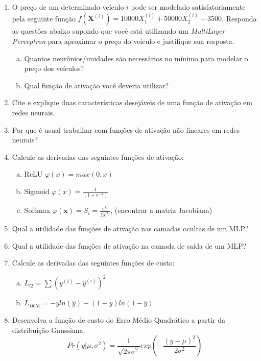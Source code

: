 \documentclass{dlproblemset}
\begin{document}
\begin{enumerate}[1)]
    \item O preço de um determinado veículo $i$ pode ser modelado satisfatoriamente pela seguinte função $f(\mathbf{X}^{(i)}) = 10000 X^{(i)}_{1} + 50000 X^{(i)}_{2} + 3500$. Responda as questões abaixo supondo que você está utilizando um \textit{MultiLayer Perceptron} para aproximar o preço do veículo e justifique sua resposta.
    \begin{enumerate}[(a)]
	    \item Quantos neurônios/unidades são necessários no mínimo para modelar o preço dos veículos?
	    \item Qual função de ativação você deveria utilizar?
    \end{enumerate}

    \item Cite e explique duas características desejáveis de uma função de ativação em redes neurais.

    \item Por que é usual trabalhar com funções de ativação não-lineares em redes neurais?

    \item Calcule as derivadas das seguintes funções de ativação:
    \begin{enumerate}[a)]
        \item ReLU $\varphi(x)=max(0,x)$
        \item Sigmoid $\varphi(x)=\frac{1}{(1+e^{-x})}$
        \item {} Softmax $\varphi(\mathbf{x})=S_i=\frac{e^{x_i}}{\Sigma e^{x_j}}$, (encontrar a matriz Jacobiana)
    \end{enumerate}

    \item Qual a utilidade das funções de ativação nas camadas ocultas de um MLP?

    \item Qual a utilidade das funções de ativação na camada de saída de um MLP?

    \item Calcule as derivadas das seguintes funções de custo:
    \begin{enumerate}[a)]
        \item  $L_{l2}=\sum\left(y^{(i)}-\hat{y}^{(i)}\right)^2$
        \item $L_{BCE}=-yln(\hat{y})-(1-y)ln(1-\hat{y})$
    \end{enumerate}

    \item Desenvolva a função de custo do Erro Médio Quadrático a partir da distribuição Gaussiana.
    \begin{equation*}
        Pr(y|\mu,\sigma^2)=\frac{1}{\sqrt{2\pi\sigma^2}}exp\left(-\frac{(y-\mu)^2}{2\sigma^2}\right)
    \end{equation*}


\end{enumerate}
\end{document}
